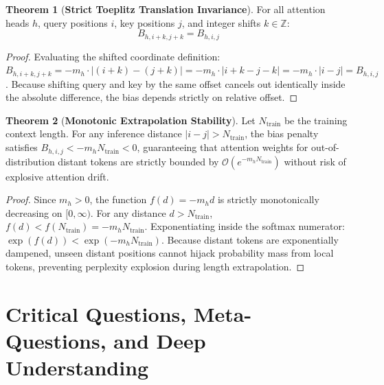 \documentclass[11pt,a4paper]{article}
\theoremstyle{definition}
\newtheorem{theorem}{\textbf{Theorem}}[section]
\begin{document}
\begin{theorem}[\textbf{Strict Toeplitz Translation Invariance}]
For all attention heads $h$, query positions $i$, key positions $j$, and integer shifts $k \in \mathbb{Z}$:
{\boldmath
\begin{equation}
B_{h, i + k, j + k} = B_{h, i, j}
\end{equation}
}
\end{theorem}

\begin{proof}
Evaluating the shifted coordinate definition:
$B_{h, i + k, j + k} = -m_h \cdot |(i + k) - (j + k)| = -m_h \cdot |i + k - j - k| = -m_h \cdot |i - j| = B_{h, i, j}$.
Because shifting query and key by the same offset cancels out identically inside the absolute difference, the bias depends strictly on relative offset.
\end{proof}

\begin{theorem}[\textbf{Monotonic Extrapolation Stability}]
Let $N_{\text{train}}$ be the training context length. For any inference distance $|i - j| > N_{\text{train}}$, the bias penalty satisfies $B_{h, i, j} < -m_h N_{\text{train}} < 0$, guaranteeing that attention weights for out-of-distribution distant tokens are strictly bounded by $\mathcal{O}(e^{-m_h N_{\text{train}}})$ without risk of explosive attention drift.
\end{theorem}

\begin{proof}
Since $m_h > 0$, the function $f(d) = -m_h d$ is strictly monotonically decreasing on $[0, \infty)$.
For any distance $d > N_{\text{train}}$, $f(d) < f(N_{\text{train}}) = -m_h N_{\text{train}}$.
Exponentiating inside the softmax numerator: $\exp(f(d)) < \exp(-m_h N_{\text{train}})$.
Because distant tokens are exponentially dampened, unseen distant positions cannot hijack probability mass from local tokens, preventing perplexity explosion during length extrapolation.
\end{proof}

\section{Critical Questions, Meta-Questions, and Deep Understanding}
\end{document}
